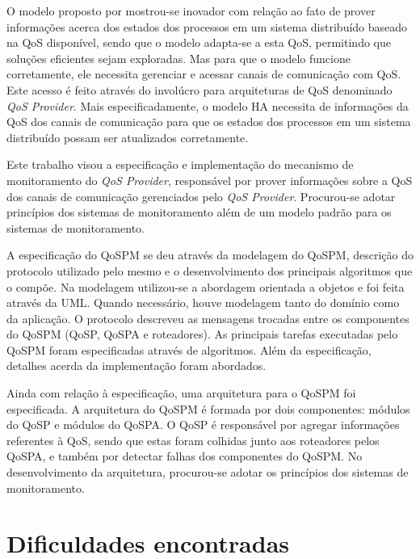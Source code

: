 \label{cap:conclusao}
\acresetall
	
	O modelo proposto por \cite{GMCR07} mostrou-se inovador com relação ao fato de prover informações acerca dos estados dos processos em um sistema distribuído baseado na QoS disponível, sendo que o modelo adapta-se a esta QoS, permitindo que soluções eficientes sejam exploradas. Mas para que o modelo funcione corretamente, ele necessita gerenciar e acessar canais de comunicação com QoS. Este acesso é feito através do involúcro para arquiteturas de QoS denominado \textit{QoS Provider}. Mais especificadamente, o modelo HA necessita de informações da QoS dos canais de comunicação para que os estados dos processos em um sistema distribuído possam ser atualizados corretamente.
	
	Este trabalho visou a especificação e implementação do mecanismo de monitoramento do \textit{QoS Provider}, responsável por prover informações sobre a QoS dos canais de comunicação gerenciados pelo \textit{QoS Provider}. Procurou-se adotar princípios dos sistemas de monitoramento além de um modelo padrão para os sistemas de monitoramento.
	
	A especificação do QoSPM se deu através da modelagem do QoSPM, descrição do protocolo utilizado pelo mesmo e o desenvolvimento dos principais algoritmos que o compõe. Na modelagem utilizou-se a abordagem orientada a objetos e foi feita através da UML. Quando necessário, houve modelagem tanto do domínio como da aplicação. O protocolo descreveu as mensagens trocadas entre os componentes do QoSPM (QoSP, QoSPA e roteadores). As principais tarefas executadas pelo QoSPM foram especificadas através de algoritmos. Além da especificação, detalhes acerda da implementação foram abordados.
	
	Ainda com relação à especificação, uma arquitetura para o QoSPM foi especificada. A arquitetura do QoSPM é formada por dois componentes: módulos do QoSP e módulos do QoSPA. O QoSP é responsável por agregar informações referentes à QoS, sendo que estas foram colhidas junto aos roteadores pelos QoSPA, e também por detectar falhas dos componentes do QoSPM. No desenvolvimento da arquitetura, procurou-se adotar os princípios dos sistemas de monitoramento.
	
\section{Dificuldades encontradas}
	

